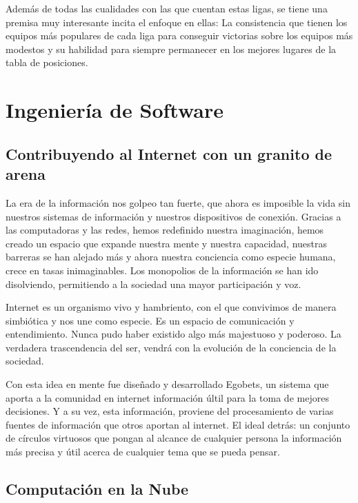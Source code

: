 Además de todas las cualidades con las que cuentan estas ligas, se tiene una premisa muy interesante incita el enfoque en ellas: La consistencia que tienen los equipos más populares de cada liga para conseguir victorias sobre los equipos más modestos y su habilidad para siempre permanecer en los mejores lugares de la tabla de posiciones. 

\section{Ingeniería de Software}
\subsection{Contribuyendo al Internet con un granito de arena}
La era de la información nos golpeo tan fuerte, que ahora es imposible la vida sin nuestros sistemas de información y nuestros dispositivos de conexión. Gracias a las computadoras y las redes, hemos redefinido nuestra imaginación, hemos creado un espacio que expande nuestra mente y nuestra capacidad, nuestras barreras se han alejado más y ahora nuestra conciencia como especie humana, crece en tasas inimaginables. Los monopolios de la información se han ido disolviendo, permitiendo a la sociedad una mayor participación y voz.

Internet es un organismo vivo y hambriento, con el que convivimos de manera simbiótica y nos une como especie. Es un espacio de comunicación y entendimiento. Nunca pudo haber existido algo más majestuoso y poderoso. La verdadera trascendencia del ser, vendrá con la evolución de la conciencia de la sociedad.

Con esta idea en mente fue diseñado y desarrollado Egobets, un sistema que aporta a la comunidad en internet información últil para la toma de mejores decisiones. Y a su vez, esta información, proviene del procesamiento de varias fuentes de información que otros aportan al internet. El ideal detrás: un conjunto de círculos virtuosos que pongan al alcance de cualquier persona la información más precisa y útil acerca de cualquier tema que se pueda pensar.

\subsection{Computación en la Nube}

